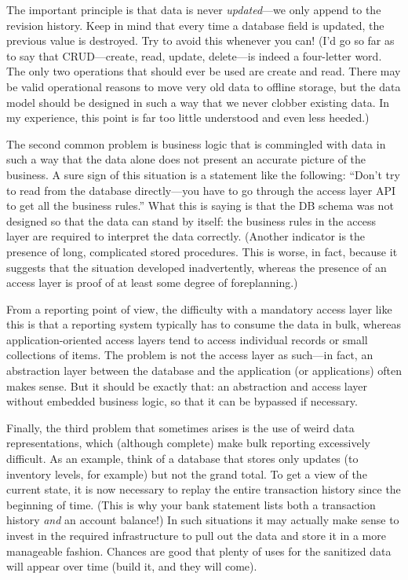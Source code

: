 The important principle is that data is never \emph{updated}---we only
append to the revision history. Keep in mind that every time a
database field is updated, the previous value is destroyed. Try to
avoid this whenever you can! (I'd go so far as to say that
CRUD---create, read, update, delete---is indeed a four-letter word.
The only two operations that should ever be used are create and read.
There may be valid operational reasons to move very old data to
offline storage, but the data model should be designed in such a way
that we never clobber existing data. In my experience, this point is
far too little understood and even less heeded.)
    
The second common problem is business logic that is commingled with
data in such a way that the data alone does not present an accurate
picture of the business.  A sure sign of this situation is a statement
like the following: ``Don't try to read from the database
directly---you have to go through the access layer API to get all the
business rules.'' What this is saying is that the DB schema was not
designed so that the data can stand by itself: the business rules in
the access layer are required to interpret the data correctly.
(Another indicator is the presence of long, complicated stored
procedures.  This is worse, in fact, because it suggests that the
situation developed inadvertently, whereas the presence of an access
layer is proof of at least some degree of foreplanning.)
    
From a reporting point of view, the difficulty with a mandatory access
layer like this is that a reporting system typically has to consume
the data in bulk, whereas application-\break oriented access layers tend to
access individual records or small collections of items. The problem
is not the access layer as such---in fact, an abstraction layer
between the database and the application (or applications) often makes
sense.  But it should be exactly that: an abstraction and access layer
without embedded business logic, so that it can be bypassed if
necessary.
    
Finally, the third problem that sometimes arises is the use of weird
data representations, which (although complete) make bulk reporting
excessively difficult.  As an example, think of a database that stores
only updates (to inventory levels, for example) but not the grand
total. To get a view of the current state, it is now necessary to
replay the entire transaction history since the beginning of time.
(This is why your bank statement lists both a transaction history
\emph{and} an account balance!) In such situations it may actually
make sense to invest in the required infrastructure to pull out the
data and store it in a more manageable fashion.  Chances are good that
plenty of uses for the sanitized data will appear over time (build it,
and they will come).


